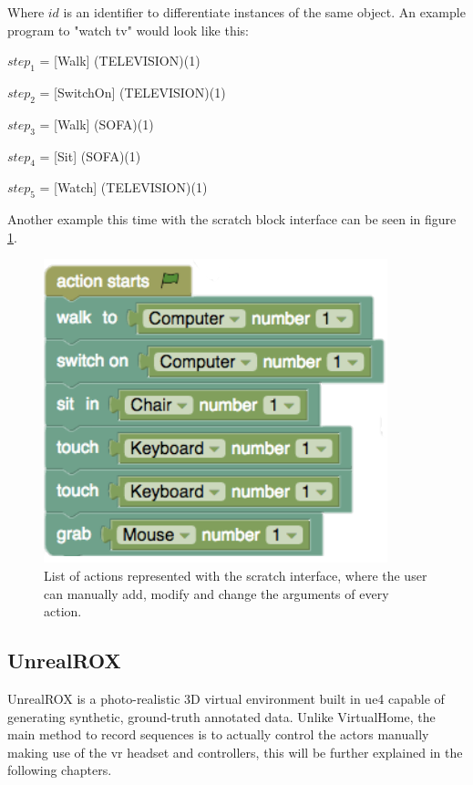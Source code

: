 Where $id$ is an identifier to differentiate instances of the same object. An example program to "watch tv" would look like this: 
\newline

$step_1$ = [Walk] (TELEVISION)(1)

$step_2$ = [SwitchOn] (TELEVISION)(1)

$step_3$ = [Walk] (SOFA)(1)

$step_4$ = [Sit] (SOFA)(1)

$step_5$ = [Watch] (TELEVISION)(1) \newline

Another example this time with the scratch block interface can be seen in figure \ref{fig:virtualhome_example}.

\begin{figure}[h]
	\includegraphics[scale=0.5]{archivos/virtualhome_example.png}
	\centering
	\caption{List of actions represented with the scratch interface, where the user can manually add, modify and change the arguments of every action.}
	\label{fig:virtualhome_example}
\end{figure}

\subsection{UnrealROX}
UnrealROX \cite{DBLP:journals/corr/abs-1810-06936} is a photo-realistic 3D virtual environment built in \gls{ue4} capable of generating synthetic, ground-truth annotated data. Unlike VirtualHome, the main method to record sequences is to actually control the actors manually making use of the \gls{vr} headset and controllers, this will be further explained in the following chapters.

